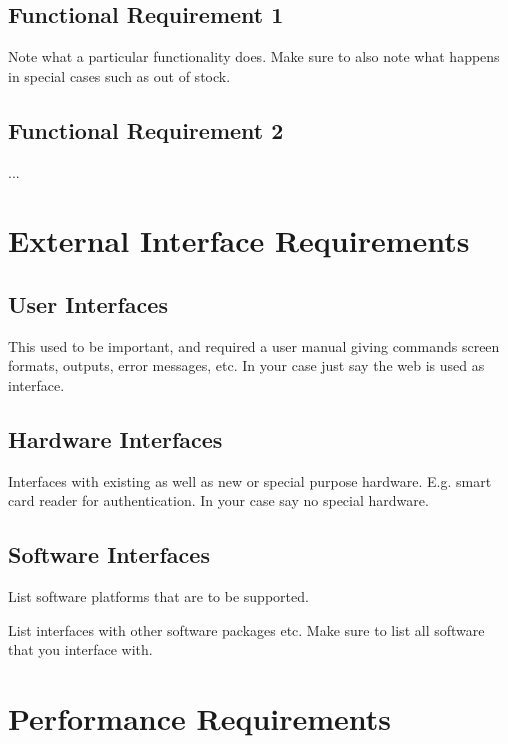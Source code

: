 \documentclass[a4wide]{article}
\begin{document}
\subsection{Functional Requirement 1}


Note what a particular functionality does.
Make sure to also note what happens in special cases such as 
out of stock.

\subsection{Functional Requirement 2}

...


\section{External Interface Requirements}

\subsection{User Interfaces}

This used to be important, and required a user manual giving commands
screen formats, outputs, error messages, etc.
In your case just say the web is used as interface.

\subsection{Hardware Interfaces}

Interfaces with existing as well as new or special purpose hardware.
E.g. smart card reader for authentication.
In your case say no special hardware.

\subsection{Software Interfaces}

List software platforms that are to be supported.

List interfaces with other software packages etc.
Make sure to list all software that you interface with.



\section{Performance Requirements}
\end{document}
